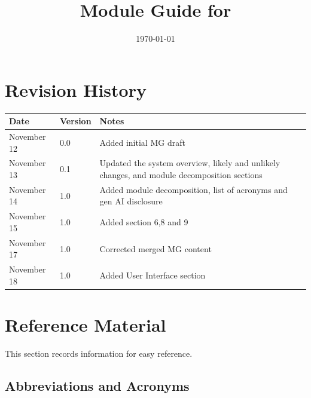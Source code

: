 \documentclass[12pt, titlepage]{article}
\begin{document}
\title{Module Guide for \progname{}} 
\author{\authname}
\date{\today}

\maketitle


\section{Revision History}

\begin{tabularx}{\textwidth}{p{3cm}p{2cm}X}
\toprule {\bf Date} & {\bf Version} & {\bf Notes}\\
\midrule
November 12 & 0.0 & Added initial MG draft\\
November 13 & 0.1 & Updated the system overview, likely and unlikely changes, and module decomposition sections\\
November 14 & 1.0 & Added module decomposition, list of acronyms and gen AI disclosure\\
November 15 & 1.0 & Added section 6,8 and 9\\
November 17 & 1.0 & Corrected merged MG content\\
November 18 & 1.0 & Added User Interface section \\

\end{tabularx}

\newpage

\section{Reference Material}

This section records information for easy reference. 

\subsection{Abbreviations and Acronyms}
\end{document}
